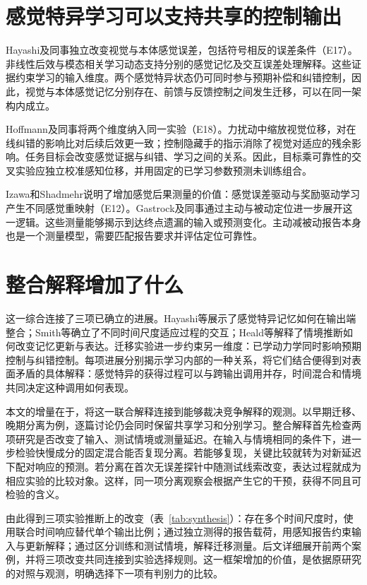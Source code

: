 \documentclass[11pt,a4paper]{article}
\begin{document}
\section{感觉特异学习可以支持共享的控制输出}
Hayashi及同事独立改变视觉与本体感觉误差，包括符号相反的误差条件（E17）。非线性后效与模态相关学习动态支持分别的感觉记忆及交互误差处理解释。这些证据约束学习的输入维度。两个感觉特异状态仍可同时参与预期补偿和纠错控制，因此，视觉与本体感觉记忆分别存在、前馈与反馈控制之间发生迁移，可以在同一架构内成立。\cite{hayashi2020}

Hoffmann及同事将两个维度纳入同一实验（E18）。力扰动中缩放视觉位移，对在线纠错的影响比对后续后效更一致；控制隐藏手的指示消除了视觉对适应的残余影响。任务目标会改变感觉证据与纠错、学习之间的关系。因此，目标乘可靠性的交叉实验应独立校准感知位移，并用固定的已学习参数预测未训练组合。\cite{hoffmann2023}

Izawa和Shadmehr说明了增加感觉后果测量的价值：感觉误差驱动与奖励驱动学习产生不同感觉重映射（E12）。Gastrock及同事通过主动与被动定位进一步展开这一逻辑。这些测量能够揭示到达终点遗漏的输入或预测变化。主动减被动报告本身也是一个测量模型，需要匹配报告要求并评估定位可靠性。\cite{izawa2011,external2020}

\section{整合解释增加了什么}
这一综合连接了三项已确立的进展。Hayashi等展示了感觉特异记忆如何在输出端整合；Smith等确立了不同时间尺度适应过程的交互；Heald等解释了情境推断如何改变记忆更新与表达。迁移实验进一步约束另一维度：已学动力学同时影响预期控制与纠错控制。每项进展分别揭示学习内部的一种关系，将它们结合便得到对表面矛盾的具体解释：感觉特异的获得过程可以与跨输出调用并存，时间混合和情境共同决定这种调用如何表现。\cite{hayashi2020,smith2006,coin2021,wagner2008,maeda2020}

本文的增量在于，将这一联合解释连接到能够裁决竞争解释的观测。以早期迁移、晚期分离为例，逐篇讨论仍会同时保留共享学习和分别学习。整合解释首先检查两项研究是否改变了输入、测试情境或测量延迟。在输入与情境相同的条件下，进一步检验快慢成分的固定混合能否复现分离。若能够复现，关键比较就转为对新延迟下配对响应的预测。若分离在首次无误差探针中随测试线索改变，表达过程就成为相应实验的比较对象。这样，同一项分离观察会根据产生它的干预，获得不同且可检验的含义。

由此得到三项实验推断上的改变（表~\ref{tab:synthesis}）：存在多个时间尺度时，使用联合时间响应替代单个输出比例；通过独立测得的报告载荷，用感知报告约束输入与更新解释；通过区分训练和测试情境，解释迁移测量。后文详细展开前两个案例，并将三项改变共同连接到实验选择规则。这一框架增加的价值，是依据原研究的对照与观测，明确选择下一项有判别力的比较。
\end{document}
